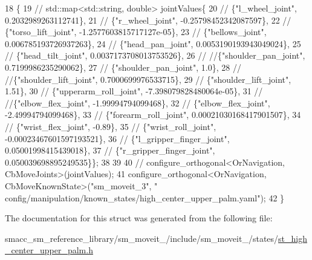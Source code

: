 \begin{DoxyCode}
18     \{
19         \textcolor{comment}{// std::map<std::string, double> jointValues\{}
20         \textcolor{comment}{//     \{"l\_wheel\_joint", 0.2032989263112741\},}
21         \textcolor{comment}{//     \{"r\_wheel\_joint", -0.25798452342087597\},}
22         \textcolor{comment}{//     \{"torso\_lift\_joint", -1.2577603815717127e-05\},}
23         \textcolor{comment}{//     \{"bellows\_joint", 0.006785193726937263\},}
24         \textcolor{comment}{//     \{"head\_pan\_joint", 0.0053190193943049024\},}
25         \textcolor{comment}{//     \{"head\_tilt\_joint", 0.0037173708013753526\},}
26         \textcolor{comment}{//     //\{"shoulder\_pan\_joint", 0.7199986235290062\},}
27         \textcolor{comment}{//     \{"shoulder\_pan\_joint", 1.0\},}
28         \textcolor{comment}{//     //\{"shoulder\_lift\_joint", 0.7000699976533715\},}
29         \textcolor{comment}{//     \{"shoulder\_lift\_joint", 1.51\},}
30         \textcolor{comment}{//     \{"upperarm\_roll\_joint", -7.398079828480064e-05\},}
31         \textcolor{comment}{//     //\{"elbow\_flex\_joint", -1.99994794099468\},}
32         \textcolor{comment}{//     \{"elbow\_flex\_joint", -2.49994794099468\},}
33         \textcolor{comment}{//     \{"forearm\_roll\_joint", 0.00021030168417901507\},}
34         \textcolor{comment}{//     \{"wrist\_flex\_joint", -0.89\},}
35         \textcolor{comment}{//     \{"wrist\_roll\_joint", -0.00023467601597193521\},}
36         \textcolor{comment}{//     \{"l\_gripper\_finger\_joint", 0.05001998415439018\},}
37         \textcolor{comment}{//     \{"r\_gripper\_finger\_joint", 0.050039698895249535\}\};}
38 
39 
40 \textcolor{comment}{//        configure\_orthogonal<OrNavigation, CbMoveJoints>(jointValues);}
41         configure\_orthogonal<OrNavigation, CbMoveKnownState>(\textcolor{stringliteral}{"sm\_moveit\_3"}, \textcolor{stringliteral}{"
      config/manipulation/known\_states/high\_center\_upper\_palm.yaml"});
42     \}
\end{DoxyCode}


The documentation for this struct was generated from the following file\+:\begin{DoxyCompactItemize}
\item 
smacc\+\_\+sm\+\_\+reference\+\_\+library/sm\+\_\+moveit\+\_/include/sm\+\_\+moveit\+\_/states/\hyperlink{st__high__center__upper__palm_8h}{st\+\_\+high\+\_\+center\+\_\+upper\+\_\+palm.\+h}\end{DoxyCompactItemize}
